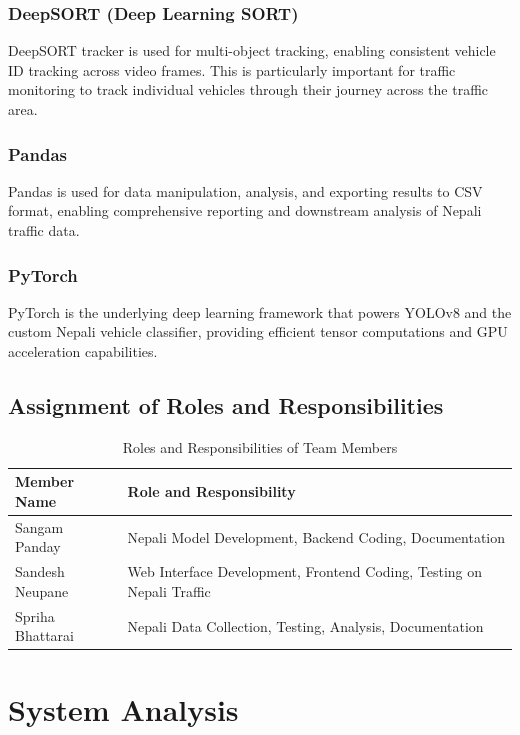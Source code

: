 \documentclass[12pt,a4paper]{report}
\begin{document}
\subsection{DeepSORT (Deep Learning SORT)}
DeepSORT tracker is used for multi-object tracking, enabling consistent vehicle ID tracking across video frames. This is particularly important for traffic monitoring to track individual vehicles through their journey across the traffic area.

\subsection{Pandas}
Pandas is used for data manipulation, analysis, and exporting results to CSV format, enabling comprehensive reporting and downstream analysis of Nepali traffic data.

\subsection{PyTorch}
PyTorch is the underlying deep learning framework that powers YOLOv8 and the custom Nepali vehicle classifier, providing efficient tensor computations and GPU acceleration capabilities.

\section{Assignment of Roles and Responsibilities}

\begin{table}[H]
\centering
\begin{tabular}{|l|l|}
\hline
\textbf{Member Name} & \textbf{Role and Responsibility} \\ \hline
Sangam Panday & Nepali Model Development, Backend Coding, Documentation \\ \hline
Sandesh Neupane & Web Interface Development, Frontend Coding, Testing on Nepali Traffic \\ \hline
Spriha Bhattarai & Nepali Data Collection, Testing, Analysis, Documentation \\ \hline
\end{tabular}
\caption{Roles and Responsibilities of Team Members}
\label{table:roles_responsibilities}
\end{table}


\chapter{System Analysis}
\end{document}
